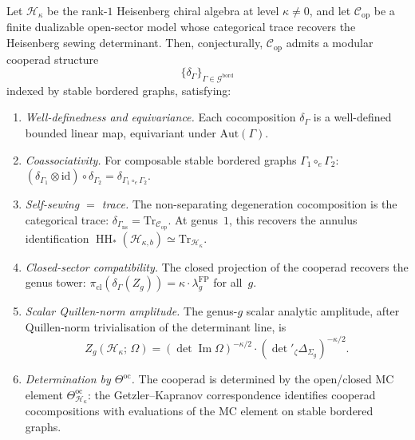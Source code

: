\documentclass[11pt]{article}
\newcommand{\cC}{\mathcal{C}}
\newcommand{\cH}{\mathcal{H}}
\newcommand{\id}{\mathrm{id}}
\newcommand{\HH}{\operatorname{HH}}
\begin{document}
\begin{conjecture}
\label{conj:ct2-heisenberg-finite-model}
Let $\cH_\kappa$ be the rank-$1$ Heisenberg chiral algebra at
level $\kappa \neq 0$, and let
$\cC_{\mathrm{op}}$ be a finite dualizable open-sector model
whose categorical trace recovers the Heisenberg sewing
determinant.  Then, conjecturally,
$\cC_{\mathrm{op}}$ admits a modular cooperad structure
\[
  \{\delta_\Gamma\}_{\Gamma \in \mathcal{G}^{\mathrm{bord}}}
\]
indexed by stable bordered graphs, satisfying:
\begin{enumerate}[label=\textup{(\roman*)},nosep]
\item \emph{Well-definedness and equivariance.}
  Each cocomposition $\delta_\Gamma$ is a well-defined
  bounded linear map, equivariant under $\mathrm{Aut}(\Gamma)$.
\item \emph{Coassociativity.}
  For composable stable bordered graphs
  $\Gamma_1 \circ_e \Gamma_2$:
  $(\delta_{\Gamma_1} \otimes \id) \circ \delta_{\Gamma_2}
  = \delta_{\Gamma_1 \circ_e \Gamma_2}$.
\item \emph{Self-sewing $=$ trace.}
  The non-separating degeneration cocomposition is the
  categorical trace:
  $\delta_{\Gamma_{\mathrm{ns}}} = \mathrm{Tr}_{\cC_{\mathrm{op}}}$.
  At genus~$1$, this recovers the annulus identification
  $\HH_*(\cH_{\kappa,b}) \simeq \mathrm{Tr}_{\cH_\kappa}$.
\item \emph{Closed-sector compatibility.}
  The closed projection of the cooperad recovers the genus
  tower: $\pi_{\mathrm{cl}}(\delta_\Gamma(Z_g))
  = \kappa \cdot \lambda_g^{\mathrm{FP}}$ for all~$g$.
\item \emph{Scalar Quillen-norm amplitude.}
  The genus-$g$ scalar analytic amplitude, after Quillen-norm
  trivialisation of the determinant line, is
  \begin{equation}\label{eq:ct2-heis-partition}
  Z_g(\cH_\kappa;\,\Omega)
  = (\det \operatorname{Im}\Omega)^{-\kappa/2}
  \cdot (\det'{}_\zeta \Delta_{\Sigma_g})^{-\kappa/2}.
  \end{equation}
\item \emph{Determination by $\Theta^{\mathrm{oc}}$.}
  The cooperad is determined by the open/closed MC element
  $\Theta^{\mathrm{oc}}_{\cH_\kappa}$: the Getzler--Kapranov
  correspondence identifies cooperad cocompositions with
  evaluations of the MC element on stable bordered graphs.
\end{enumerate}
\end{conjecture}
\end{document}
